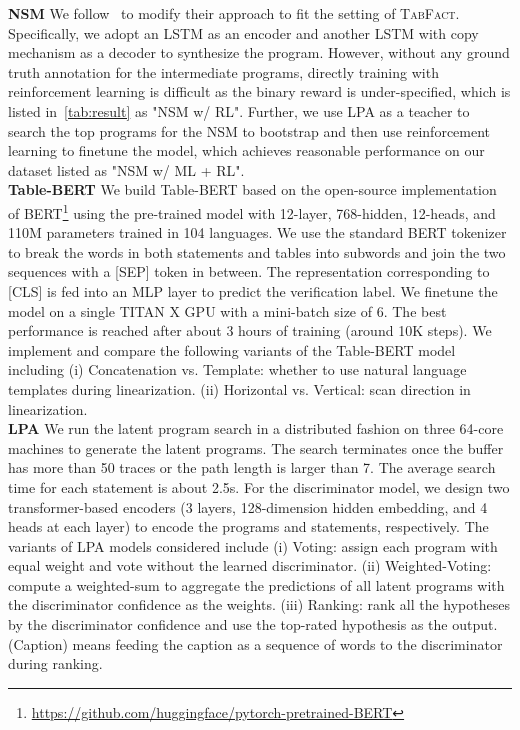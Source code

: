 \documentclass{article} \usepackage{iclr2020_conference,times}
\begin{document}
\noindent \textbf{NSM}
We follow~\cite{liang2017neural} to modify their approach to fit the setting of \textsc{TabFact}. Specifically, we adopt an LSTM as an encoder and another LSTM with copy mechanism as a decoder to synthesize the program. However, without any ground truth annotation for the intermediate programs, directly training with reinforcement learning is difficult as the binary reward is under-specified, which is listed in~\autoref{tab:result} as "NSM w/ RL". Further, we use LPA as a teacher to search the top programs for the NSM to bootstrap and then use reinforcement learning to finetune the model, which achieves reasonable performance on our dataset listed as "NSM w/ ML + RL". \vspace{3px}\\
\noindent \textbf{Table-BERT}
We build Table-BERT based on the open-source implementation of BERT\footnote{\url{https://github.com/huggingface/pytorch-pretrained-BERT}} using the pre-trained model with 12-layer, 768-hidden, 12-heads, and 110M parameters trained in 104 languages. We use the standard BERT tokenizer to break the words in both statements and tables into subwords and join the two sequences with a [SEP] token in between. The representation corresponding to [CLS] is fed into an MLP layer to predict the verification label. We finetune the model on a single TITAN X GPU with a mini-batch size of 6. The best performance is reached after about 3 hours of training (around 10K steps). We implement and compare the following variants of the Table-BERT model including (i) Concatenation vs. Template: whether to use natural language templates during linearization. (ii) Horizontal vs. Vertical: scan direction in linearization. \vspace{3px}\\
\noindent \textbf{LPA}
We run the latent program search in a distributed fashion on three 64-core machines to generate the latent programs. The search terminates once the buffer has more than 50 traces or the path length is larger than 7. The average search time for each statement is about 2.5s. For the discriminator model, we design two transformer-based encoders (3 layers, 128-dimension hidden embedding, and 4 heads at each layer) to encode the programs and statements, respectively. The variants of LPA models considered include (i) Voting: assign each program with equal weight and vote without the learned discriminator. (ii) Weighted-Voting: compute a weighted-sum to aggregate the predictions of all latent programs with the discriminator confidence as the weights. (iii) Ranking: rank all the hypotheses by the discriminator confidence and use the top-rated hypothesis as the output. (Caption) means feeding the caption as a sequence of words to the discriminator during ranking. \vspace{3px}\\
\end{document}
